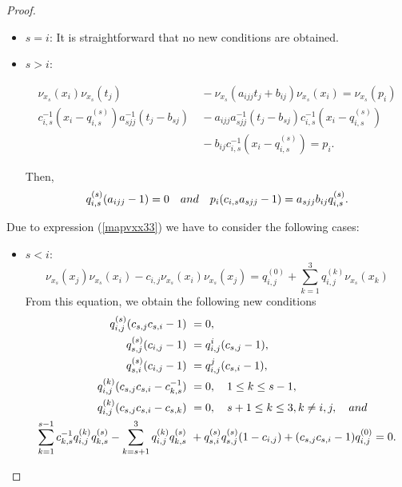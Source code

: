 \documentclass[10pt,a4paper]{amsart}
\begin{document}
\begin{proof}
\begin{itemize}
   In this way, 
    \begin{align*}
        b_{sj}(a_{ijj}-1) &\ =b_{ij}(a_{sjj}-1), \\
        q_{s,i}^{(s)}(a_{ijj}-1) &\ =0, \quad {\rm and} \\
        p_i(c_{s,i}-a_{sjj}) &\ =b_{ij}q_{s,i}^{(s)}.
    \end{align*}
    
    \item $s = i$: It is straightforward that no new conditions are obtained.
    
    \item $s > i$: 

    \begin{align*}
          \nu_{x_s}(x_i)\nu_{x_s}(t_j) &\ - \nu_{x_s}(a_{ijj}t_j+b_{ij})\nu_{x_s}(x_i) = \nu_{x_s}(p_i) \\
           c_{i,s}^{-1}(x_i-q_{i,s}^{(s)})a_{sjj}^{-1}(t_j-b_{sj}) &\ -a_{ijj}a_{sjj}^{-1}(t_j-b_{sj})c_{i,s}^{-1}(x_i-q_{i,s}^{(s)}) \\
           &\ - b_{ij}c_{i,s}^{-1}(x_i-q_{i,s}^{(s)}) = p_i.
    \end{align*}
  
Then, 
\[
q_{i,s}^{(s)}(a_{ijj}-1) = 0 \quad {\rm and} \quad p_i(c_{i,s}a_{sjj}-1) = a_{sjj}b_{ij}q_{i,s}^{(s)}. 
\]
\end{itemize}

Due to expression {\rm (}\ref{mapvxx33}{\rm )} we have to consider the following cases:
\begin{itemize}
    \item $s < i$:
    \begin{equation*}
        \nu_{x_s}(x_j)\nu_{x_s}(x_i)-c_{i,j}\nu_{x_s}(x_i)\nu_{x_s}(x_j) = q_{i,j}^{(0)}+\sum_{k=1}^{3}q_{i,j}^{(k)}\nu_{x_s}(x_k)
    \end{equation*}
    From this equation, we obtain the following new conditions
    \begin{align*}
        q_{i,j}^{(s)}(c_{s,j}c_{s,i}-1) &\ =0, \\
        q_{s,j}^{(s)}(c_{i,j}-1) &\ = q_{i,j}^{i}(c_{s,j}-1), \\
        q_{s,i}^{(s)}(c_{i,j}-1) &\ = q_{i,j}^{j}(c_{s,i}-1), \\
        q_{i,j}^{(k)}(c_{s,j}c_{s,i}-c_{k,s}^{-1}) &\ =0, \quad 1\leq k \leq s-1, \\
        q_{i,j}^{(k)}(c_{s,j}c_{s,i}-c_{s,k}) &\ =0, \quad s+1\leq k \leq 3, k\ne i, j, \quad {\rm and}  \\
        \sum_{k=1}^{s-1}c_{k,s}^{-1}q_{i,j}^{(k)}q_{k,s}^{(s)}-\sum_{k=s+1}^{3}q_{i,j}^{(k)}q_{k,s}^{(s)} &\ +q_{s,i}^{(s)}q_{s,j}^{(s)}(1-c_{i,j})+(c_{s,j}c_{s,i}-1)q_{i,j}^{(0)}  = 0.
    \end{align*}
    

\end{itemize}
\end{proof}
\end{document}
